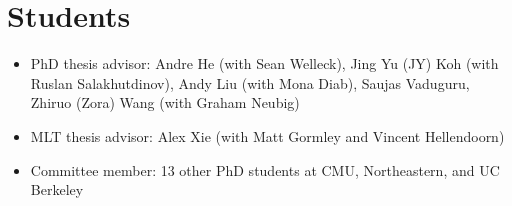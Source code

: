 %





\section{Students}
\begin{itemize}[leftmargin=-0.4mm,partopsep=0pt,label=]
  \item PhD thesis advisor:
   Andre He (with Sean Welleck),
   Jing Yu (JY) Koh (with Ruslan Salakhutdinov),
   Andy Liu (with Mona Diab),
   Saujas Vaduguru,
   Zhiruo (Zora) Wang (with Graham Neubig)
   \item MLT thesis advisor: Alex Xie (with Matt Gormley and Vincent Hellendoorn)
   \item Committee member: 13 other PhD students at CMU, Northeastern, and UC Berkeley
 \end{itemize}
 \vspace{-0.5em}

